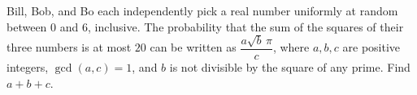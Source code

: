 Bill, Bob, and Bo each independently pick a real number uniformly at random between \(0\) and \(6\), inclusive. The probability that the sum of the squares of their three numbers is at most \(20\) can be written as \(\dfrac{a\sqrt b\,\pi}{c}\), where \(a,b,c\) are positive integers, \(\gcd(a,c)=1\), and \(b\) is not divisible by the square of any prime. Find \(a+b+c\).

